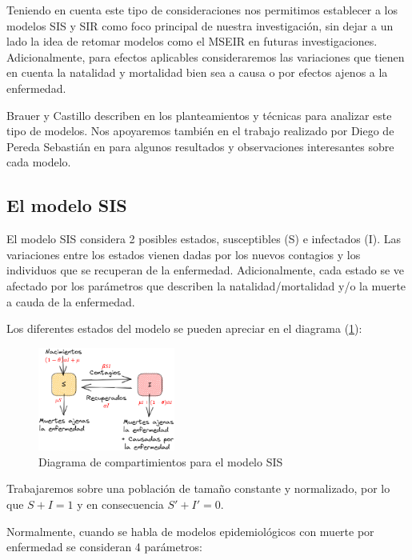 Teniendo en cuenta este tipo de consideraciones nos permitimos establecer a los modelos SIS y SIR como foco principal de nuestra investigación, sin dejar a un lado la idea de retomar modelos como el MSEIR en futuras investigaciones. Adicionalmente, para efectos aplicables consideraremos las variaciones que tienen en cuenta la natalidad y mortalidad bien sea a causa o por efectos ajenos a la enfermedad.

Brauer y Castillo describen en \cite{mateModelsInPopulationAndEpidemiology} los planteamientos y técnicas para analizar este tipo de modelos. Nos apoyaremos también en el trabajo realizado por Diego de Pereda Sebastián en \cite{diego2010} para algunos resultados y observaciones interesantes sobre cada modelo.

\subsection{El modelo SIS}\label{sub:modeloSIS}

El modelo SIS considera 2 posibles estados, susceptibles (S) e infectados (I). Las variaciones entre los estados vienen dadas por los nuevos contagios y los individuos que se recuperan de la enfermedad. Adicionalmente, cada estado se ve afectado por los parámetros que describen la natalidad/mortalidad y/o la muerte a cauda de la enfermedad. 

Los diferentes estados del modelo se pueden apreciar en el diagrama (\ref{fig:SIS}):

\begin{figure}[h]
  \centering
    \includegraphics[width=0.4\textwidth]{Imagenes/SIS_compartimientos.PNG}
  \caption{Diagrama de compartimientos para el modelo SIS}
  \label{fig:SIS}
\end{figure}

Trabajaremos sobre una población de tamaño constante y normalizado, por lo que $S + I = 1$ y en consecuencia $S' + I' = 0$.

Normalmente, cuando se habla de modelos epidemiológicos con muerte por enfermedad se consideran 4 parámetros: 

